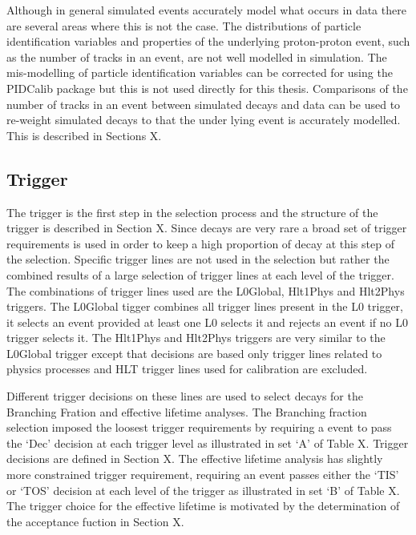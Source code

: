 Although in general simulated events accurately model what occurs in data there are several areas where this is not the case. The distributions of particle identification variables and properties of the underlying proton-proton event, such as the number of tracks in an event, are not well modelled in simulation. %
The mis-modelling of particle identification variables can be corrected for using the PIDCalib package but this is not used directly for this thesis. 
Comparisons of the number of tracks in an event between simulated decays and data can be used to re-weight simulated decays to that the under lying event is accurately modelled. This is described in Sections X.

\subsection{Trigger}
\label{sec:triggerRequirements}

The trigger is the first step in the selection process and the structure of the trigger is described in Section X. Since \bsmumu decays are very rare a broad set of trigger requirements is used in order to keep a high proportion of \bsmumu decay at this step of the selection. Specific trigger lines are not used in the selection but rather the combined results of a large selection of trigger lines at each level of the trigger. The combinations of trigger lines used are the L0Global, Hlt1Phys and Hlt2Phys triggers. The L0Global tigger combines all trigger lines present in the L0 trigger, it selects an event provided at least one L0 selects it and rejects an event if no L0 trigger selects it. The Hlt1Phys and Hlt2Phys triggers are very similar to the L0Global trigger except that decisions are based only trigger lines related to physics processes and HLT trigger lines used for calibration are excluded. 

Different trigger decisions on these lines are used to select decays for the Branching Fration and effective lifetime analyses. The Branching fraction selection imposed the loosest trigger requirements by requiring a event to pass the `Dec' decision at each trigger level as illustrated in set `A' of Table X. Trigger decisions are defined in Section X. The effective lifetime analysis has slightly more constrained trigger requirement, requiring an event passes either the `TIS' or `TOS' decision at each level of the trigger as illustrated in set `B' of Table X. The trigger choice for the effective lifetime is motivated by the determination of the acceptance fuction in Section X. 

